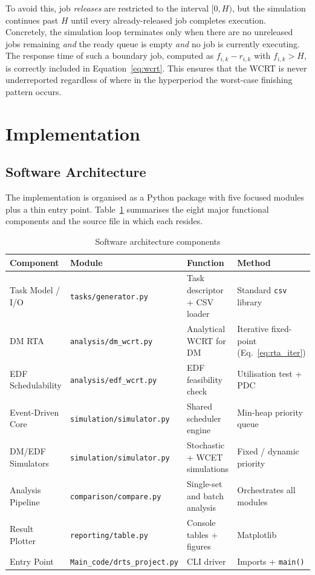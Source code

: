 \documentclass[12pt,a4paper]{article}
\begin{document}
To avoid this, job \emph{releases} are restricted to the interval \([0, H)\), but the simulation continues past \(H\) until every already-released job completes execution. Concretely, the simulation loop terminates only when there are no unreleased jobs remaining \emph{and} the ready queue is empty \emph{and} no job is currently executing. The response time of such a boundary job, computed as \(f_{i,k} - r_{i,k}\) with \(f_{i,k} > H\), is correctly included in Equation~\ref{eq:wcrt}. This ensures that the WCRT is never underreported regardless of where in the hyperperiod the worst-case finishing pattern occurs.

\section{Implementation}
\label{sec:implementation}

\subsection{Software Architecture}

The implementation is organised as a Python package with five focused modules plus a thin entry point. Table~\ref{tab:architecture} summarises the eight major functional components and the source file in which each resides.

\begin{table}[H]
\centering
\caption{Software architecture components}
\label{tab:architecture}
\begin{tabular}{@{}llll@{}}
\toprule
\textbf{Component} & \textbf{Module} & \textbf{Function} & \textbf{Method} \\
\midrule
Task Model / I/O     & \texttt{tasks/generator.py}      & Task descriptor + CSV loader    & Standard \texttt{csv} library \\
DM RTA               & \texttt{analysis/dm\_wcrt.py}    & Analytical WCRT for DM          & Iterative fixed-point (Eq.~\ref{eq:rta_iter}) \\
EDF Schedulability   & \texttt{analysis/edf\_wcrt.py}   & EDF feasibility check           & Utilisation test + PDC \\
Event-Driven Core    & \texttt{simulation/simulator.py} & Shared scheduler engine         & Min-heap priority queue \\
DM/EDF Simulators    & \texttt{simulation/simulator.py} & Stochastic + WCET simulations   & Fixed / dynamic priority \\
Analysis Pipeline    & \texttt{comparison/compare.py}   & Single-set and batch analysis   & Orchestrates all modules \\
Result Plotter       & \texttt{reporting/table.py}      & Console tables + figures        & Matplotlib \\
Entry Point          & \texttt{Main\_code/drts\_project.py} & CLI driver                  & Imports + \texttt{main()} \\
\bottomrule
\end{tabular}
\end{table}
\end{document}
